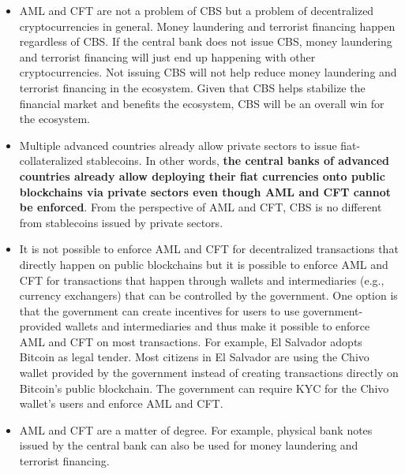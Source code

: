 \documentclass[dvipdfmx,a4paper]{article}
\begin{document}
\begin{itemize}
\item AML and CFT are not a problem of CBS but a problem of decentralized cryptocurrencies in general. Money laundering and terrorist financing happen regardless of CBS. If the central bank does not issue CBS, money laundering and terrorist financing will just end up happening with other cryptocurrencies. Not issuing CBS will not help reduce money laundering and terrorist financing in the ecosystem. Given that CBS helps stabilize the financial market and benefits the ecosystem, CBS will be an overall win for the ecosystem.
\item Multiple advanced countries already allow private sectors to issue fiat-collateralized stablecoins. In other words, \textbf{the central banks of advanced countries already allow deploying their fiat currencies onto public blockchains via private sectors even though AML and CFT cannot be enforced}. From the perspective of AML and CFT, CBS is no different from stablecoins issued by private sectors.
\item It is not possible to enforce AML and CFT for decentralized transactions that directly happen on public blockchains but it is possible to enforce AML and CFT for transactions that happen through wallets and intermediaries (e.g., currency exchangers) that can be controlled by the government. One option is that the government can create incentives for users to use government-provided wallets and intermediaries and thus make it possible to enforce AML and CFT on most transactions. For example, El Salvador adopts Bitcoin as legal tender. Most citizens in El Salvador are using the Chivo wallet provided by the government instead of creating transactions directly on Bitcoin's public blockchain. The government can require KYC for the Chivo wallet's users and enforce AML and CFT.
\item AML and CFT are a matter of degree. For example, physical bank notes issued by the central bank can also be used for money laundering and terrorist financing.

\end{itemize}
\end{document}
